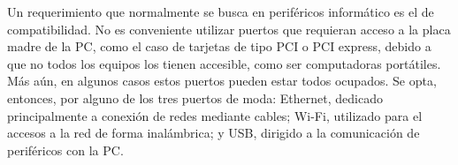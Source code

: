 



Un requerimiento que normalmente se busca en periféricos informático es el de compatibilidad. No es conveniente utilizar puertos que requieran acceso a la placa madre de la PC, como el caso de tarjetas de tipo PCI o PCI express, debido a que no todos los equipos los tienen accesible, como ser computadoras portátiles. Más aún, en algunos casos estos puertos pueden estar todos ocupados. Se opta, entonces, por alguno de los tres puertos de moda: Ethernet, dedicado principalmente a conexión de redes mediante cables; Wi-Fi, utilizado para el accesos a la red de forma inalámbrica; y USB, dirigido a la comunicación de periféricos con la PC.%

